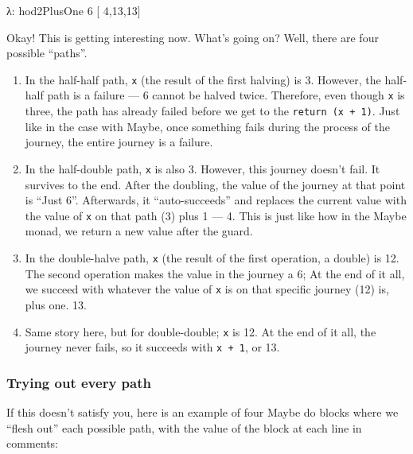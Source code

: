 \documentclass[]{article}
\newenvironment{Shaded}{}{}
\newcommand{\DecValTok}[1]{\textcolor[rgb]{0.25,0.63,0.44}{{#1}}}
\newcommand{\FunctionTok}[1]{\textcolor[rgb]{0.02,0.16,0.49}{{#1}}}
\newcommand{\NormalTok}[1]{{#1}}
\begin{document}
\begin{Shaded}
\begin{Highlighting}[]
\NormalTok{λ}\FunctionTok{:} \NormalTok{hod2PlusOne }\DecValTok{6}
\NormalTok{[   }\DecValTok{4}\NormalTok{,}\DecValTok{13}\NormalTok{,}\DecValTok{13}\NormalTok{]}
\end{Highlighting}
\end{Shaded}

Okay! This is getting interesting now. What's going on? Well, there are four possible ``paths''.

\begin{enumerate}
\def\labelenumi{\arabic{enumi}.}
\tightlist
\item
  In the half-half path, \texttt{x} (the result of the first halving) is 3. However, the half-half
  path is a failure --- 6 cannot be halved twice. Therefore, even though \texttt{x} is three, the
  path has already failed before we get to the \texttt{return\ (x\ +\ 1)}. Just like in the case
  with Maybe, once something fails during the process of the journey, the entire journey is a
  failure.
\item
  In the half-double path, \texttt{x} is also 3. However, this journey doesn't fail. It survives to
  the end. After the doubling, the value of the journey at that point is ``Just 6''. Afterwards, it
  ``auto-succeeds'' and replaces the current value with the value of \texttt{x} on that path (3)
  plus 1 --- 4. This is just like how in the Maybe monad, we return a new value after the guard.
\item
  In the double-halve path, \texttt{x} (the result of the first operation, a double) is 12. The
  second operation makes the value in the journey a 6; At the end of it all, we succeed with
  whatever the value of \texttt{x} is on that specific journey (12) is, plus one. 13.
\item
  Same story here, but for double-double; \texttt{x} is 12. At the end of it all, the journey never
  fails, so it succeeds with \texttt{x\ +\ 1}, or 13.
\end{enumerate}

\subsubsection{Trying out every path}\label{trying-out-every-path}

If this doesn't satisfy you, here is an example of four Maybe do blocks where we ``flesh out'' each
possible path, with the value of the block at each line in comments:
\end{document}

